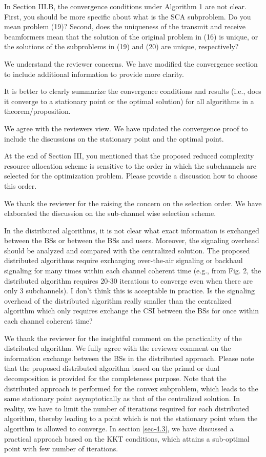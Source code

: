  In Section III.B, the convergence conditions under Algorithm 1 are not clear. First, you should be more specific about what is the SCA subproblem. Do you mean problem (19)? Second, does the uniqueness of the transmit and receive beamformers mean that the solution of the original problem in (16) is unique, or the solutions of the subproblems in (19) and (20) are unique, respectively?

\resp We understand the reviewer concerns. We have modified the convergence section to include additional information to provide more clarity. 

 It is better to clearly summarize the convergence conditions and results (i.e., does it converge to a stationary point or the optimal solution) for all algorithms in a theorem/proposition.

\resp We agree with the reviewers view. We have updated the convergence proof to include the discussions on the stationary point and the optimal point.

 At the end of Section III, you mentioned that the proposed reduced complexity resource allocation scheme is sensitive to the order in which the subchannels are selected for the optimization problem. Please provide a discussion how to choose this order.

\resp We thank the reviewer for the raising the concern on the selection order. We have elaborated the discussion on the sub-channel wise selection scheme. 

 In the distributed algorithms, it is not clear what exact information is exchanged between the BSs or between the BSs and users. Moreover, the signaling overhead should be analyzed and compared with the centralized solution. The proposed distributed algorithms require exchanging over-the-air signaling or backhaul signaling for many times within each channel coherent time (e.g., from Fig. 2, the distributed algorithm requires 20-30 iterations to converge even when there are only 3 subchannels). I don’t think this is acceptable in practice. Is the signaling overhead of the distributed algorithm really smaller than the centralized algorithm which only requires exchange the CSI between the BSs for once within each channel coherent time?

\resp We thank the reviewer for the insightful comment on the practicality of the distributed algorithm. We fully agree with the reviewer comment on the information exchange between the BSs in the distributed approach. Please note that the proposed distributed algorithm based on the primal or dual decomposition is provided for the completeness purpose. Note that the distributed approach is performed for the convex subproblem, which leads to the same stationary point asymptotically as that of the centralized solution. In reality, we have to limit the number of iterations required for each distributed algorithm, thereby leading to a point which is not the stationary point when the algorithm is allowed to converge. In section \ref{sec-4.3}, we have discussed a practical approach based on the KKT conditions, which attains a sub-optimal point with few number of iterations.

